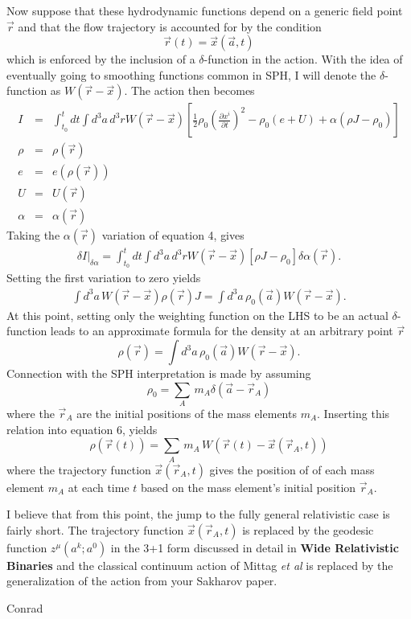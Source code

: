 \documentclass{article}
\begin{document}
Now suppose that these hydrodynamic functions depend on a generic field point ${\vec r}$ and that the flow trajectory is accounted for by the condition
\begin{equation}
{\vec r}(t) = {\vec x}({\vec a},t)
\end{equation}
which is enforced by the inclusion of a $\delta$-function in the action.  With the idea of eventually going to smoothing functions common in SPH, I will denote the $\delta$-function as $W({\vec r} - {\vec x})$.  The action then becomes
\begin{eqnarray}
I & = & \int_{t_0}^t \! dt \int \! d^3a \, d^3r W({\vec r} - {\vec x})\left[ \frac{1}{2} \rho_0 \left( \frac{\partial x^i}{\partial t} \right)^2 - \rho_0 (e + U) + \alpha (\rho J - \rho_0) \right] \\
\rho & = & \rho(\vec r) \nonumber \\
e & =  & e \left( \rho(\vec r) \right) \nonumber \\
U & = & U(\vec r) \nonumber \\
\alpha & = & \alpha(\vec r) \nonumber
\end{eqnarray}
Taking the $\alpha(\vec r)$ variation of equation 4, gives
\begin{eqnarray}
\delta I \vert_{\delta \alpha} = \int_{t_0}^t \! dt \int \! d^3a \, d^3r W({\vec r} - {\vec x}) \left[ \rho J - \rho_0 \right] \delta \alpha(\vec r).
\end{eqnarray}
Setting the first variation to zero yields
\begin{eqnarray}
\int \! d^3a \, W(\vec r - \vec x) \rho(\vec r) J = \int \! d^3a \, \rho_{0}(\vec a) W(\vec r - \vec x).
\end{eqnarray}
At this point, setting only the weighting function on the LHS to be an actual $\delta$-function leads to an approximate formula for the density at an arbitrary point $\vec r$
\begin{equation}
\rho (\vec r) = \int \! d^3a \, \rho_0(\vec a) W(\vec r - \vec x). 
\end{equation}
Connection with the SPH interpretation is made by assuming
\begin{equation}
\rho_{0} = \sum_{A} \, m_{A} \delta(\vec a - \vec r_A)
\end{equation}
where the $\vec r_{A}$ are the initial positions of the mass elements $m_A$.
Inserting this relation into equation 6, yields
\begin{equation}
\rho(\vec r(t)) = \sum_{A} \, m_{A} \, W \left(\vec r(t) - \vec x \left(\vec r_A, t \right) \right)
\end{equation}
where the trajectory function $\vec x \left(\vec r_A , t \right)$ gives the position of of each mass element $m_A$ at each time $t$ based on the mass element's initial position $\vec r_A$.

I believe that from this point, the jump to the fully general relativistic case is fairly short.  The trajectory function $\vec x \left(\vec r_A, t \right)$ is replaced by the geodesic function $z^\mu \left( a^k; a^0 \right)$ in the 3+1 form discussed in detail in \textbf{Wide Relativistic Binaries} and the classical continuum action of Mittag \emph{et al} is replaced by the generalization of the action from your Sakharov paper.

Conrad
\end{document}
